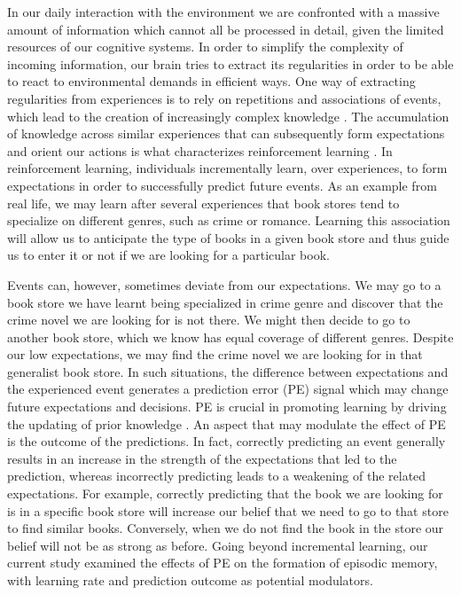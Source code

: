 \documentclass[a4paper,12pt]{article}
\begin{document}

In our daily interaction with the environment we are confronted with a massive amount of information which cannot all be processed in detail, given the limited resources of our cognitive systems. In order to simplify the complexity of incoming information, our brain tries to extract its regularities in order to be able to react to environmental demands in efficient ways. One way of extracting regularities from experiences is to rely on repetitions and associations of events, which lead to the creation of increasingly complex knowledge \citep{Ghosh2014, Tse2007}. The accumulation of knowledge across similar experiences that can subsequently form expectations and orient our actions is what characterizes reinforcement learning \citep{Sutton1998}. In reinforcement learning, individuals incrementally learn, over experiences, to form expectations in order to successfully predict future events. As an example from real life, we may learn after several experiences that book stores tend to specialize on different genres, such as crime or romance. Learning this association will allow us to anticipate the type of books in a given book store and thus guide us to enter it or not if we are looking for a particular book. \par 
Events can, however, sometimes deviate from our expectations. We may go to a book store we have learnt being specialized in crime genre and discover that the crime novel we are looking for is not there. We might then decide to go to another book store, which we know has equal coverage of different genres. Despite our low expectations, we may find the crime novel we are looking for in that generalist book store. In such situations, the difference between expectations and the experienced event generates a prediction error (PE) signal which may change future expectations and decisions. PE is crucial in promoting learning by driving the updating of prior knowledge \citep{Ergo2020, Friston2018}. An aspect that may modulate the effect of PE is the outcome of the predictions. In fact, correctly predicting an event generally results in an increase in the strength of the expectations that led to the prediction, whereas incorrectly predicting leads to a weakening of the related expectations\citep{Daw2013}. For example, correctly predicting that the book we are looking for is in a specific book store will increase our belief that we need to go to that store to find similar books. Conversely, when we do not find the book in the store our belief will not be as strong as before. Going beyond incremental learning, our current study examined the effects of PE on the formation of episodic memory, with learning rate and prediction outcome as potential modulators. 
\end{document}
